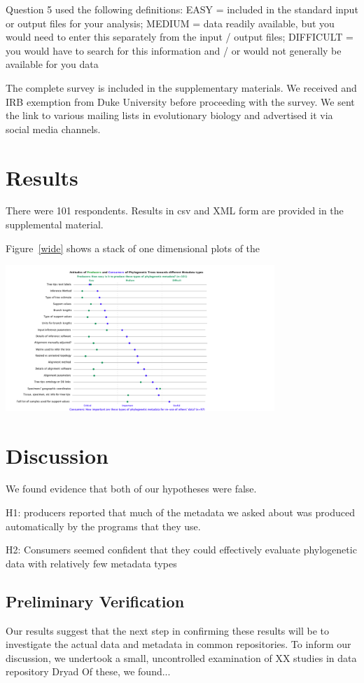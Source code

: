 \documentclass[12pt]{scrartcl}
\newenvironment{Figure}
  {\par\medskip\noindent\minipage{\linewidth}}
  {\endminipage\par\medskip}
\begin{document}
Question 5 used the following definitions: EASY = included in the standard input or output files for your analysis; MEDIUM = data readily available, but you would need to enter this separately from the input / output files; DIFFICULT = you would have to search for this information and / or would not generally be available for you data

The complete survey is included in the supplementary materials. We received and IRB exemption from Duke University before proceeding with the survey. We sent the link to various mailing lists in evolutionary biology and advertised it via social media channels. 

\section{Results}
There were 101 respondents. Results in csv and XML form are provided in the supplemental material. 

Figure~\ref{wide} shows a stack of one dimensional plots of the 
\begin{Figure}
	\centering
	\includegraphics[width=4in]{rasters/OTOL_graph_wide.png}
	\label{wide}
\end{Figure}

\section{Discussion}
We found evidence that both of our hypotheses were false. 

H1: producers reported that much of the metadata we asked about was produced automatically by the programs that they use.

H2: Consumers seemed confident that they could effectively evaluate phylogenetic data with relatively few metadata types

\subsection{Preliminary Verification}
Our results suggest that the next step in confirming these results will be to investigate the actual data and metadata in common repositories.  To inform our discussion, we undertook a small, uncontrolled examination of XX%
studies in data repository Dryad %
Of these, we found... %
\end{document}

